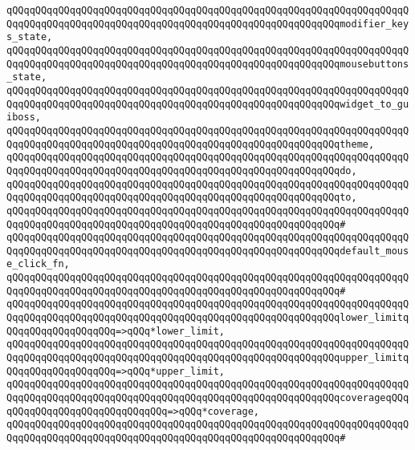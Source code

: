 \verb|qQQqqQQqqQQqqQQqqQQqqQQqqQQqqQQqqQQqqQQqqQQqqQQqqQQqqQQqqQQqqQQqqQQqqQQqqQQqqQQqqQQqqQQqqQQqqQQqqQQqqQQqqQQqqQQqqQQqqQQqqQQqqQQqmodifier_keys_state,|\newline
\verb|qQQqqQQqqQQqqQQqqQQqqQQqqQQqqQQqqQQqqQQqqQQqqQQqqQQqqQQqqQQqqQQqqQQqqQQqqQQqqQQqqQQqqQQqqQQqqQQqqQQqqQQqqQQqqQQqqQQqqQQqqQQqqQQqmousebuttons_state,|\newline
\verb|qQQqqQQqqQQqqQQqqQQqqQQqqQQqqQQqqQQqqQQqqQQqqQQqqQQqqQQqqQQqqQQqqQQqqQQqqQQqqQQqqQQqqQQqqQQqqQQqqQQqqQQqqQQqqQQqqQQqqQQqqQQqqQQqwidget_to_guiboss,|\newline
\verb|qQQqqQQqqQQqqQQqqQQqqQQqqQQqqQQqqQQqqQQqqQQqqQQqqQQqqQQqqQQqqQQqqQQqqQQqqQQqqQQqqQQqqQQqqQQqqQQqqQQqqQQqqQQqqQQqqQQqqQQqqQQqqQQqtheme,|\newline
\verb|qQQqqQQqqQQqqQQqqQQqqQQqqQQqqQQqqQQqqQQqqQQqqQQqqQQqqQQqqQQqqQQqqQQqqQQqqQQqqQQqqQQqqQQqqQQqqQQqqQQqqQQqqQQqqQQqqQQqqQQqqQQqqQQqdo,|\newline
\verb|qQQqqQQqqQQqqQQqqQQqqQQqqQQqqQQqqQQqqQQqqQQqqQQqqQQqqQQqqQQqqQQqqQQqqQQqqQQqqQQqqQQqqQQqqQQqqQQqqQQqqQQqqQQqqQQqqQQqqQQqqQQqqQQqto,|\newline
\verb|qQQqqQQqqQQqqQQqqQQqqQQqqQQqqQQqqQQqqQQqqQQqqQQqqQQqqQQqqQQqqQQqqQQqqQQqqQQqqQQqqQQqqQQqqQQqqQQqqQQqqQQqqQQqqQQqqQQqqQQqqQQqqQQq#|\newline
\verb|qQQqqQQqqQQqqQQqqQQqqQQqqQQqqQQqqQQqqQQqqQQqqQQqqQQqqQQqqQQqqQQqqQQqqQQqqQQqqQQqqQQqqQQqqQQqqQQqqQQqqQQqqQQqqQQqqQQqqQQqqQQqqQQqdefault_mouse_click_fn,|\newline
\verb|qQQqqQQqqQQqqQQqqQQqqQQqqQQqqQQqqQQqqQQqqQQqqQQqqQQqqQQqqQQqqQQqqQQqqQQqqQQqqQQqqQQqqQQqqQQqqQQqqQQqqQQqqQQqqQQqqQQqqQQqqQQqqQQq#|\newline
\verb|qQQqqQQqqQQqqQQqqQQqqQQqqQQqqQQqqQQqqQQqqQQqqQQqqQQqqQQqqQQqqQQqqQQqqQQqqQQqqQQqqQQqqQQqqQQqqQQqqQQqqQQqqQQqqQQqqQQqqQQqqQQqqQQqlower_limitqQQqqQQqqQQqqQQqqQQq=>qQQq*lower_limit,|\newline
\verb|qQQqqQQqqQQqqQQqqQQqqQQqqQQqqQQqqQQqqQQqqQQqqQQqqQQqqQQqqQQqqQQqqQQqqQQqqQQqqQQqqQQqqQQqqQQqqQQqqQQqqQQqqQQqqQQqqQQqqQQqqQQqqQQqupper_limitqQQqqQQqqQQqqQQqqQQq=>qQQq*upper_limit,|\newline
\verb|qQQqqQQqqQQqqQQqqQQqqQQqqQQqqQQqqQQqqQQqqQQqqQQqqQQqqQQqqQQqqQQqqQQqqQQqqQQqqQQqqQQqqQQqqQQqqQQqqQQqqQQqqQQqqQQqqQQqqQQqqQQqqQQqcoverageqQQqqQQqqQQqqQQqqQQqqQQqqQQqqQQq=>qQQq*coverage,|\newline
\verb|qQQqqQQqqQQqqQQqqQQqqQQqqQQqqQQqqQQqqQQqqQQqqQQqqQQqqQQqqQQqqQQqqQQqqQQqqQQqqQQqqQQqqQQqqQQqqQQqqQQqqQQqqQQqqQQqqQQqqQQqqQQqqQQq#|\newline
